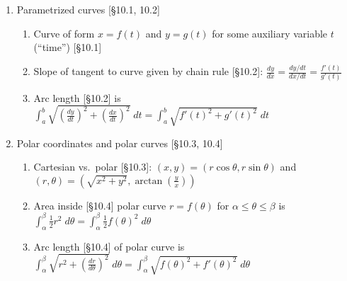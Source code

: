 \documentclass[11pt]{article}
\begin{document}
\begin{enumerate}
\item Parametrized curves [\S10.1, 10.2]
\begin{enumerate}
\item Curve of form $x=f(t)$ and $y=g(t)$ for some auxiliary variable $t$ (``time'') [\S10.1]
\item Slope of tangent to curve given by chain rule [\S10.2]: $\frac{dy}{dx} = \frac{dy/dt}{dx/dt} = \frac{f'(t)}{g'(t)}$ 
\item Arc length [\S10.2] is $\int_{a}^{b} \sqrt{(\frac{dy}{dt})^2 + (\frac{dx}{dt})^2} \; dt = \int_{a}^{b} \sqrt{f'(t)^2 + g'(t)^2} \; dt$
\end{enumerate}

\item Polar coordinates and polar curves [\S10.3, 10.4]
\begin{enumerate}
\item Cartesian vs.~polar [\S10.3]: $(x,y) = (r\cos \theta, r \sin \theta)$ and $(r,\theta) = (\sqrt{x^2+y^2}, \arctan (\frac{y}{x}))$
\item Area inside [\S10.4] polar curve $r=f(\theta)$ for $\alpha \leq \theta \leq \beta$ is $\int_{\alpha}^{\beta} \frac{1}{2} r^2 \; d\theta=\int_{\alpha}^{\beta} \frac{1}{2} f(\theta)^2 \; d\theta$ 
\item Arc length [\S10.4] of polar curve is $\int_{\alpha}^{\beta} \sqrt{r^2 + (\frac{dr}{d\theta})^2} \; d\theta = \int_{\alpha}^{\beta} \sqrt{f(\theta)^2 + f'(\theta)^2} \; d\theta$ 
\end{enumerate}


\end{enumerate}
\end{document}

